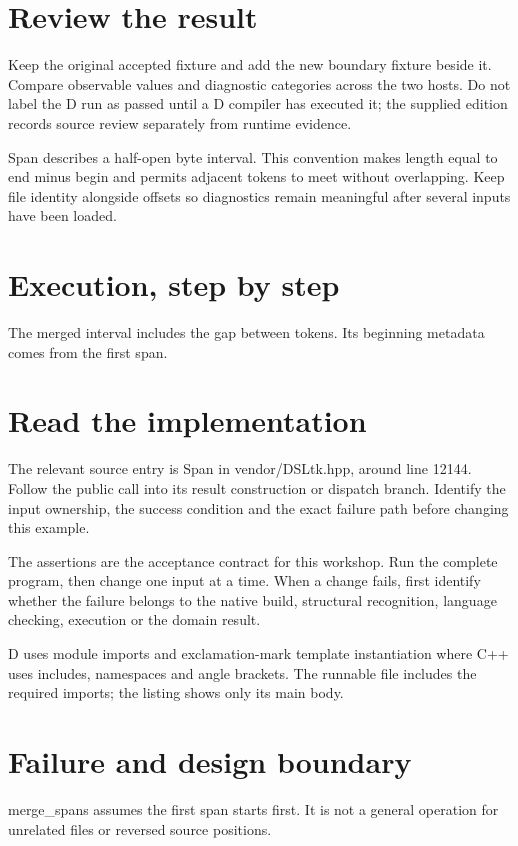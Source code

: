 \section*{Review the result}
Keep the original accepted fixture and add the new boundary fixture beside it. Compare observable values and diagnostic categories across the two hosts. Do not label the D run as passed until a D compiler has executed it; the supplied edition records source review separately from runtime evidence.

\clearpage
{}
Span describes a half-open byte interval. This convention makes length equal to end minus begin and permits adjacent tokens to meet without overlapping. Keep file identity alongside offsets so diagnostics remain meaningful after several inputs have been loaded.


\section*{Execution, step by step}
The merged interval includes the gap between tokens. Its beginning metadata comes from the first span.

\section*{Read the implementation}
The relevant source entry is Span in vendor/DSLtk.hpp, around line 12144. Follow the public call into its result construction or dispatch branch. Identify the input ownership, the success condition and the exact failure path before changing this example.

The assertions are the acceptance contract for this workshop. Run the complete program, then change one input at a time. When a change fails, first identify whether the failure belongs to the native build, structural recognition, language checking, execution or the domain result.

\clearpage
{}
D uses module imports and exclamation-mark template instantiation where C++ uses includes, namespaces and angle brackets. The runnable file includes the required imports; the listing shows only its main body.


\section*{Failure and design boundary}
merge\_spans assumes the first span starts first. It is not a general operation for unrelated files or reversed source positions.

